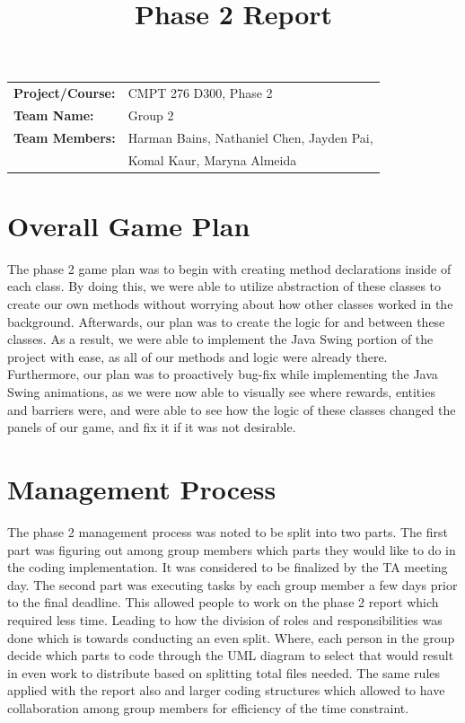 \documentclass[12pt,letterpaper]{article}
\title{Phase 2 Report}
\author{}
\begin{document}
\maketitle

\begin{tabular}{ll}
\textbf{Project/Course:} & CMPT 276 D300, Phase 2 \\
\textbf{Team Name:}      & Group 2 \\
\textbf{Team Members:}   & Harman Bains, Nathaniel Chen, Jayden Pai, \\
                         & Komal Kaur, Maryna Almeida
\end{tabular}


\section{Overall Game Plan}
The phase 2 game plan was to begin with creating method declarations inside of each class. By doing this, we were able to utilize abstraction of these classes to create our own methods without worrying about how other classes worked in the background. Afterwards, our plan was to create the logic for and between these classes. As a result, we were able to implement the Java Swing portion of the project with ease, as all of our methods and logic were already there. Furthermore, our plan was to proactively bug-fix while implementing the Java Swing animations, as we were now able to visually see where rewards, entities and barriers were, and were able to see how the logic of these classes changed the panels of our game, and fix it if it was not desirable.

\section{Management Process}
The phase 2 management process was noted to be split into two parts. The first part was figuring out among group members which parts they would like to do in the coding implementation. It was considered to be finalized by the TA meeting day. The second part was executing tasks by each group member a few days prior to the final deadline. This allowed people to work on the phase 2 report which required less time. Leading to how the division of roles and responsibilities was done which is towards conducting an even split. Where, each person in the group decide which parts to code through the UML diagram to select that would result in even work to distribute based on splitting total files needed. The same rules applied with the report also and larger coding structures which allowed to have collaboration among group members for efficiency of the time constraint. 
\end{document}
